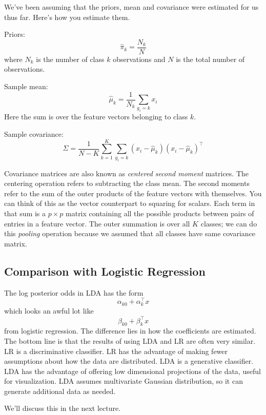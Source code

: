 \documentclass[a4paper]{article}
\begin{document}
We've been assuming that the priors, mean and covariance were estimated for us thus far.  Here's how you estimate them.

Priors:
$$
\hat{\pi}_{k} = \frac{N_k}{N}
$$
where $N_k$ is the number of class $k$ observations and $N$ is the total number of observations.

Sample mean:
$$
\hat{\mu}_{k} = \frac{1}{N_k} \sum_{g_i = k} x_i
$$
Here the sum is over the feature vectors belonging to class $k$.

Sample covariance:
$$
\hat{\Sigma} = \frac{1}{N-K} \sum_{k=1}^{K} \sum_{g_i = k} (x_i-\hat{\mu}_k)(x_i - \hat{\mu}_k)^\top
$$

Covariance matrices are also known as \emph{centered second moment} matrices.  The centering operation refers to subtracting the class mean.  The second moments refer to the sum of the outer products of the feature vectors with themselves.  You can think of this as the vector counterpart to squaring for scalars.  Each term in that sum is a $p\times p$ matrix containing all the possible products between pairs of entries in a feature vector.  The outer summation is over all $K$ classes; we can do this \emph{pooling} operation because we assumed that all classes have same covariance matrix.  


\subsection{Comparison with Logistic Regression}

The log posterior odds in LDA has the form 
$$
\alpha_{k0} + \alpha_{k}^{\top}x
$$
which looks an awful lot like
$$
\beta_{k0} + \beta_{k}^{\top}x
$$
from logistic regression.  The difference lies in how the coefficients are estimated. The bottom line is that the results of using LDA and LR are often very similar.  LR is a discriminative classifier. LR has the advantage of making fewer assumptions about how the data are distributed.  LDA is a generative classifier. LDA has the advantage of offering low dimensional projections of the data, useful for visualization.  LDA assumes multivariate Gaussian distribution, so it can generate additional data as needed. 

We'll discuss this in the next lecture.
\end{document}
